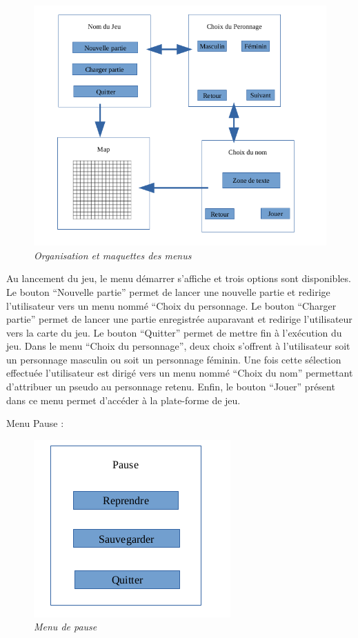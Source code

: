 \documentclass[11pt, a4paper]{article}
\begin{document}
\begin{figure}[h]
  \centering
  \includegraphics[scale=0.5]{img/MenuDemarrer.png}
  \caption{\emph{Organisation et maquettes des menus}}
\end{figure}

Au lancement du jeu, le menu démarrer s’affiche et trois options sont disponibles. Le bouton “Nouvelle partie” permet de lancer une nouvelle partie et redirige l’utilisateur vers un menu nommé “Choix du personnage. Le bouton “Charger partie” permet de lancer une partie enregistrée auparavant et redirige l’utilisateur vers la carte du jeu. Le bouton “Quitter” permet de mettre fin à l’exécution du jeu.
Dans le menu “Choix du personnage”, deux choix s’offrent à l’utilisateur soit un personnage masculin ou soit un personnage féminin. Une fois cette sélection effectuée l’utilisateur est dirigé vers un menu nommé “Choix du nom” permettant d’attribuer un pseudo au personnage retenu. Enfin, le bouton “Jouer” présent dans ce menu permet d’accéder à la plate-forme de jeu.

Menu Pause : 

\begin{figure}[h]
  \centering
  \includegraphics[scale=1]{img/MenuPause.png}
  \caption{\emph{Menu de pause}}
\end{figure}
\end{document}
